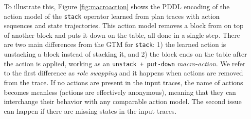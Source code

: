 To illustrate this, Figure \ref{fig:macroaction} shows the PDDL encoding of the action model of the {\tt stack} operator learned from plan traces with \NO action sequences and state trajectories. This action model removes a block from on top of another block and puts it down on the table, all done in a single step. There are two main differences from the GTM for {\tt stack}: 1) the learned action is unstacking a block instead of stacking it, and 2) the block ends on the table after the action is applied, working as an {\tt unstack + put-down} \emph{macro-action}. We refer to the first difference as \emph{role swapping} and it happens when actions are removed from the trace. If no actions are present in the input traces, the name of actions becomes meanless (actions are effectively anonymous), meaning that they can interchange their behavior with any comparable action model. The second issue can happen if there are missing states in the input traces. 

